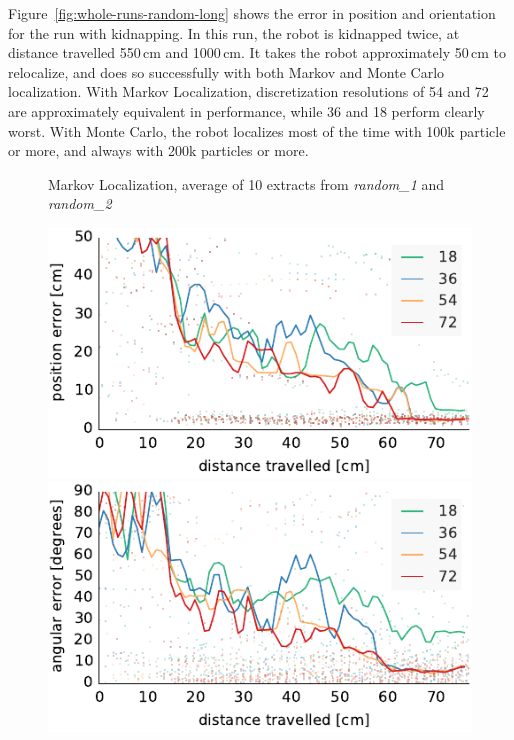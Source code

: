 \documentclass[letterpaper, 10pt, conference]{ieeeconf}
\newcommand{\Fig}[1]{Figure~\ref{fig:#1}}
\begin{document}
\Fig{whole-runs-random-long} shows the error in position and orientation for the run with kidnapping.
In this run, the robot is kidnapped twice, at distance travelled 550\,cm and 1000\,cm.
It takes the robot approximately 50\,cm to relocalize, and does so successfully with both Markov and Monte Carlo localization.
With Markov Localization, discretization resolutions of 54 and 72 are approximately equivalent in performance, while 36 and 18 perform clearly worst.
With Monte Carlo, the robot localizes most of the time with 100k particle or more, and always with 200k particles or more.

\begin{figure}

\begin{center}
Markov Localization, average of 10 extracts from \emph{random\_1} and \emph{random\_2}
\end{center}
\includegraphics{ml-small_runs_random_12-xy}\hfill
\includegraphics{ml-small_runs_random_12-theta}

\vspace{.5em}


\end{figure}
\end{document}
